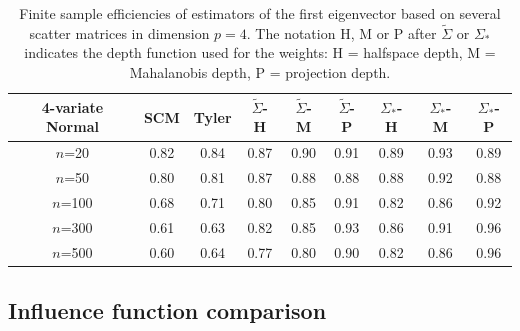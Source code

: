 \begin{table}[t]
\begin{scriptsize}
\begin{tabular}{c|cc|ccc|ccc}
    4-variate Normal   & SCM  & Tyler & $\tilde{\Sigma}$-H & $\tilde{\Sigma}$-M & $\tilde{\Sigma}$-P & ${\Sigma}_{*}$-H & ${\Sigma}_{*}$-M & ${\Sigma}_{*}$-P \\ \hline
    $n$=20             & 0.82 & 0.84  & 0.87   & 0.90   & 0.91  & 0.89    & 0.93    & 0.89   \\
    $n$=50             & 0.80 & 0.81  & 0.87   & 0.88   & 0.88  & 0.88    & 0.92    & 0.88   \\
    $n$=100            & 0.68 & 0.71  & 0.80   & 0.85   & 0.91  & 0.82    & 0.86    & 0.92   \\
    $n$=300            & 0.61 & 0.63  & 0.82   & 0.85   & 0.93  & 0.86    & 0.91    & 0.96   \\
    $n$=500            & 0.60 & 0.64  & 0.77   & 0.80   & 0.90  & 0.82    & 0.86    & 0.96   \\ \hline
    \end{tabular}
\end{scriptsize}
\caption{Finite sample efficiencies of estimators of the first eigenvector based on 
several scatter matrices in dimension $p=4$. The notation
 H, M or P after $\tilde{\Sigma}$ or ${\Sigma}_{*}$ indicates the depth function 
 used for the weights: H = halfspace depth, M = Mahalanobis depth, P = projection depth.}
\label{table:FSEtable4}
\end{table}





\subsection{Influence function comparison}


